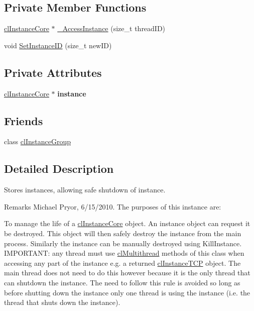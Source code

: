\subsection*{Private Member Functions}
\begin{DoxyCompactItemize}
\item 
\hyperlink{classcl_instance_core}{clInstanceCore} $\ast$ \hyperlink{classcl_instance_container_aecc82ed22b1fa93cb36b0fcc6f311f46}{\_\-AccessInstance} (size\_\-t threadID)
\item 
void \hyperlink{classcl_instance_container_a68bb446d4b29b6a31ead4af6dd0eb55b}{SetInstanceID} (size\_\-t newID)
\end{DoxyCompactItemize}
\subsection*{Private Attributes}
\begin{DoxyCompactItemize}
\item 
\hypertarget{classcl_instance_container_ac61b6dc5eff7efcc9dd62e4976b832b0}{
\hyperlink{classcl_instance_core}{clInstanceCore} $\ast$ {\bfseries instance}}
\label{classcl_instance_container_ac61b6dc5eff7efcc9dd62e4976b832b0}

\end{DoxyCompactItemize}
\subsection*{Friends}
\begin{DoxyCompactItemize}
\item 
class \hyperlink{classcl_instance_container_a95dcaa37ec56761e5d8f6818ff0da441}{clInstanceGroup}
\end{DoxyCompactItemize}


\subsection{Detailed Description}
Stores instances, allowing safe shutdown of instance. \begin{DoxyRemark}{Remarks}
Michael Pryor, 6/15/2010. The purposes of this instance are:
\begin{DoxyItemize}
\item To manage the life of a \hyperlink{classcl_instance_core}{clInstanceCore} object. An instance object can request it be destroyed. This object will then safely destroy the instance from the main process. Similarly the instance can be manually destroyed using KillInstance. IMPORTANT: any thread must use \hyperlink{classcl_multithread}{clMultithread} methods of this class when accessing any part of the instance e.g. a returned \hyperlink{classcl_instance_t_c_p}{clInstanceTCP} object. The main thread does not need to do this however because it is the only thread that can shutdown the instance. The need to follow this rule is avoided so long as before shutting down the instance only one thread is using the instance (i.e. the thread that shuts down the instance).
\end{DoxyItemize}
\end{DoxyRemark}

